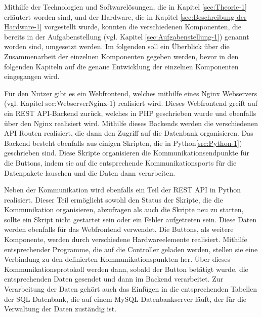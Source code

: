 Mithilfe der Technologien und Softwarelösungen, die in Kapitel \ref{sec:Theorie-1} erläutert worden sind, und der Hardware, die in Kapitel \ref{sec:Beschreibung der Hardware-1} vorgestellt wurde, konnten die verschiedenen Komponenten, die bereits in der Aufgabenstellung (vgl. Kapitel \ref{sec:Aufgabenstellung-1}) genannt worden sind, umgesetzt werden. 
Im folgenden soll ein Überblick über die Zusammenarbeit der einzelnen Komponenten gegeben werden, bevor in den folgenden Kapiteln auf die genaue Entwicklung der einzelnen Komponenten eingegangen wird. 

Für den Nutzer gibt es ein Webfrontend, welches mithilfe eines Nginx Webservers (vgl. Kapitel {sec:WebserverNginx-1}) realisiert wird. Dieses Webfrontend greift auf ein \ac{REST} \ac{API}-Backend zurück, welches in \ac{PHP} geschrieben wurde und ebenfalls über den Nginx realisiert wird. Mithilfe dieses Backends werden die verschiedenen \ac{API} Routen realisiert, die dann den Zugriff auf die Datenbank organisieren. Das Backend besteht ebenfalls aus einigen Skripten, die in Python\ref{src:Python-1}) geschrieben sind. Diese Skripte organisieren die Kommunikationsendpunkte für die Buttons, indem sie auf die entsprechende Kommunikationsports für die Datenpakete lauschen und die Daten dann verarbeiten. 

Neben der Kommunikation wird ebenfalls ein Teil der \ac{REST} \ac{API} in Python realisiert. Dieser Teil ermöglicht sowohl den Status der Skripte, die die Kommunikation organisieren, abzufragen als auch die Skripte neu zu starten, sollte ein Skript nicht gestartet sein oder ein Fehler aufgetreten sein. Diese Daten werden ebenfalls für das Webfrontend verwendet. 
Die Buttons, als weitere Komponente, werden durch verschiedene Hardwareelemente realisiert. Mithilfe entsprechender Programme, die auf die Controller geladen werden, stellen sie eine Verbindung zu den definierten Kommunikationspunkten her. Über dieses Kommunikationsprotokoll werden dann, sobald der Button betätigt wurde, die entsprechenden Daten gesendet und dann im Backend verarbeitet. 
Zur Verarbeitung der Daten gehört auch das Einfügen in die entsprechenden Tabellen der SQL Datenbank, die auf einem MySQL Datenbankserver läuft, der für die Verwaltung der Daten zuständig ist. 
